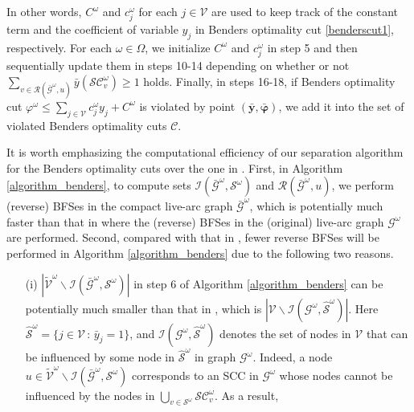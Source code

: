 \documentclass[a4paper,10pt]{article}
\newcommand{\V}{\mathcal{V}}
\theoremstyle{plain}
\newcommand{\revv}[1]{{#1}}
\begin{document}
{{		%
		In other words,} $C^\omega$ and $c_j^\omega$ for each $j \in \V$ are used to keep track of the constant term and the coefficient of variable $y_j$ in Benders optimality cut \eqref{benderscut1}, respectively.
	For each $\omega \in \Omega$, we initialize $C^\omega$ and $c_j^\omega$ in step 5 and then sequentially update them \revv{in steps 10-14} depending on whether or not $\sum_{v\in\mathcal{R}(\bar{\mathcal{G}}^{\omega},u)}\bar{y}(\mathcal{SC}_v^{\omega})
	\geq1$ \revv{holds}.
	Finally, in steps 16-18, if Benders optimality cut $\varphi^{\omega}\leq \sum_{j\in\mathcal{V}}c_j^{\omega}y_j+C^{\omega}$ is violated by point $(\bar{\boldsymbol{y}},\bar{\boldsymbol{\varphi}})$, we add it into the set of violated Benders optimality cuts $\mathcal{C}$.
	
	It is worth emphasizing the computational efficiency of our separation algorithm for the Benders optimality cuts over the one in \cite{Guney2020}.
	First, in Algorithm \ref{algorithm_benders},  to compute sets  $\revv{\mathcal{I}(\bar{\mathcal{G}}^\omega, \mathcal{S}^{\omega})}$ and  $\mathcal{R}(\mathcal{\bar{G}}^\omega, u)$, we perform (reverse) BFSes in the compact live-arc graph $\bar{\mathcal{G}}^{\omega}$,
	which is potentially much faster than that in \cite{Guney2020} where the (reverse) BFSes in the (original) live-arc graph ${\mathcal{G}}^{\omega}$ are performed.
	\revv{Second, compared with that in \cite{Guney2020}, fewer reverse BFSes will be performed in Algorithm \ref{algorithm_benders} due to the following two reasons. }
	\begin{itemize}
		\item [(i)] \revv{$|\tilde{\mathcal{V}}^\omega\backslash \mathcal{I}(\bar{\mathcal{G}}^\omega, \mathcal{S}^\omega)|$ in step 6 of Algorithm \ref{algorithm_benders} can be potentially much smaller than that in \cite{Guney2020}, which is $|{\mathcal{V}}\backslash \mathcal{I}({\mathcal{G}}^\omega, \hat{\mathcal{S}}^\omega)|$.
			Here $\hat{\mathcal{S}}^\omega=\{j \in \mathcal{V}\, : \, \bar{y}_j =1\}$, and $\revv{\mathcal{I}({\mathcal{G}}^\omega, \hat{\mathcal{S}}^{\omega})}$ denotes the set of nodes in $\mathcal{V}$ that can be influenced by some node in $\hat{\mathcal{S}}^\omega$ in graph $\mathcal{G}^\omega$.
			Indeed, a node $u\in \tilde{\mathcal{V}}^\omega\backslash \mathcal{I}(\bar{\mathcal{G}}^\omega, \mathcal{S}^\omega)$ corresponds to an SCC in $\mathcal{G}^\omega$ whose nodes cannot be influenced by the nodes in $\bigcup_{v \in \mathcal{S}^\omega}\mathcal{SC}_v^\omega$.
			As a result,
			\begin{equation}

\end{equation}}
\end{itemize}}
\end{document}
